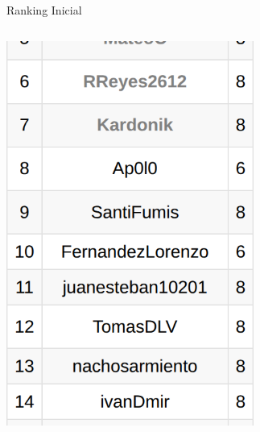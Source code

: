 \documentclass{beamer}
\begin{document}
\begin{frame}{Ranking Inicial}
\begin{columns}
        \includegraphics[width=0.7\textwidth,keepaspectratio]{img/inicial-2.png}
    \end{columns}
\end{frame}
\end{document}
